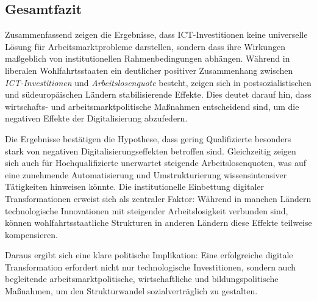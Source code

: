 
\subsection{Gesamtfazit}

Zusammenfassend zeigen die Ergebnisse, dass \ac{ICT}-Investitionen keine universelle Lösung für 
Arbeitsmarktprobleme darstellen, sondern dass ihre Wirkungen maßgeblich von institutionellen 
Rahmenbedingungen abhängen. Während in liberalen Wohlfahrtsstaaten ein deutlicher positiver 
Zusammenhang zwischen \textit{\ac{ICT}-Investitionen} und \textit{Arbeitslosenquote} besteht, zeigen 
sich in postsozialistischen und südeuropäischen Ländern stabilisierende Effekte. Dies deutet darauf 
hin, dass wirtschafts- und arbeitsmarktpolitische Maßnahmen entscheidend sind, um die negativen Effekte 
der Digitalisierung abzufedern.

Die Ergebnisse bestätigen die Hypothese, dass gering Qualifizierte besonders stark von negativen 
Digitalisierungseffekten betroffen sind. Gleichzeitig zeigen sich auch für Hochqualifizierte unerwartet 
steigende Arbeitslosenquoten, was auf eine zunehmende Automatisierung und Umstrukturierung 
wissensintensiver Tätigkeiten hinweisen könnte. Die institutionelle Einbettung digitaler 
Transformationen erweist sich als zentraler Faktor: Während in manchen Ländern technologische 
Innovationen mit steigender Arbeitslosigkeit verbunden sind, können wohlfahrtsstaatliche Strukturen in 
anderen Ländern diese Effekte teilweise kompensieren.

Daraus ergibt sich eine klare politische Implikation: Eine erfolgreiche digitale Transformation 
erfordert nicht nur technologische Investitionen, sondern auch begleitende arbeitsmarktpolitische, 
wirtschaftliche und bildungspolitische Maßnahmen, um den Strukturwandel sozialverträglich zu gestalten.

